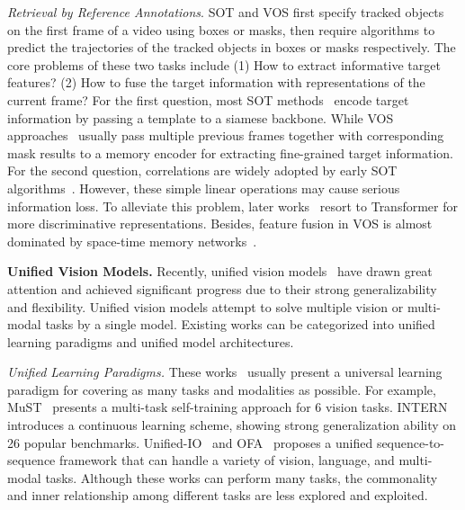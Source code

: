 \documentclass[10pt,twocolumn,letterpaper]{article}
\begin{document}
\textit{Retrieval by Reference Annotations}. SOT and VOS first specify tracked objects on the first frame of a video using boxes or masks, then require algorithms to predict the trajectories of the tracked objects in boxes or masks respectively. The core problems of these two tasks include (1) How to extract informative target features? (2) How to fuse the target information with representations of the current frame? For the first question, most SOT methods~\cite{SiameseFC,SiameseRPN,SiamRPNplusplus,TransT,STARK} encode target information by passing a template to a siamese backbone. While VOS approaches~\cite{STM,CFBI,STCN} usually pass multiple previous frames together with corresponding mask results to a memory encoder for extracting fine-grained target information. For the second question, correlations are widely adopted by early SOT algorithms~\cite{SiameseFC,SiameseRPN,AlphaRefine}. However, these simple linear operations may cause serious information loss. To alleviate this problem, later works~\cite{TransT,STARK,MixFormer,OSTrack} resort to Transformer for more discriminative representations. Besides, feature fusion in VOS is almost dominated by space-time memory networks~\cite{STM,CFBI,STCN,XMem}.

\textbf{Unified Vision Models.} 
Recently, unified vision models~\cite{MuST,INTERN,OFA-Ali,Gato,MaskRCNN,Mask2Former,Unicorn,Pix2SeqV2,GLIP,Uni-Perceiver,Unified-IO} have drawn great attention and achieved significant progress due to their strong generalizability and flexibility. Unified vision models attempt to solve multiple vision or multi-modal tasks by a single model. Existing works can be categorized into unified learning paradigms and unified model architectures.


\textit{Unified Learning Paradigms.} These works~\cite{MuST,INTERN,OFA-Ali,Gato,Pathways,Uni-Perceiver,Unified-IO} usually present a universal learning paradigm for covering as many tasks and modalities as possible. For example, MuST~\cite{MuST} presents a multi-task self-training approach for 6 vision tasks. INTERN~\cite{INTERN} introduces a continuous learning scheme, showing strong generalization ability on 26 popular benchmarks. Unified-IO~\cite{Unified-IO} and OFA~\cite{OFA-Ali} proposes a unified sequence-to-sequence framework that can handle a variety of vision, language, and multi-modal tasks. Although these works can perform many tasks, the commonality and inner relationship among different tasks are less explored and exploited.
\end{document}
